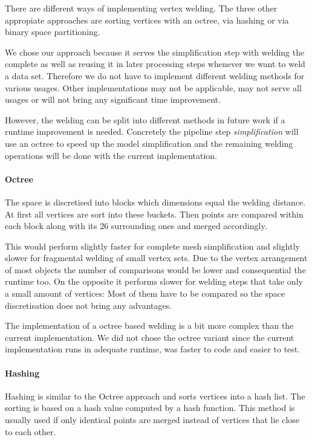 \documentclass[../ClassicThesis.tex]{subfiles}
\begin{document}
There are different ways of implementing vertex welding. The three other appropiate approaches are sorting vertices with an octree, via hashing or via binary space partitioning.

We chose our approach because it serves the simplification step with welding the complete {\threedmodel} as well as reusing it in later processing steps whenever we want to weld a data set. Therefore we do not have to implement different welding methods for various usages. Other implementations may not be applicable, may not serve all usages or will not bring any significant time improvement.

However, the welding can be split into different methods in future work if a runtime improvement is needed. Concretely the pipeline step \emph{simplification} will use an octree to speed up the model simplification and the remaining welding operations will be done with the current implementation.

\paragraph{Octree}

The space is discretised into blocks which dimensions equal the welding distance. At first all vertices are sort into these buckets. Then points are compared within each block along with its 26 surrounding ones and merged accordingly.

This would perform slightly faster for complete mesh simplification and slightly slower for fragmental welding of small vertex sets. Due to the vertex arrangement of most objects the number of comparisons would be lower and consequential the runtime too. On the opposite it performs slower for welding steps that take only a small amount of vertices: Most of them have to be compared so the space discretisation does not bring any advantages.

The implementation of a octree based welding is a bit more complex than the current implementation. We did not chose the octree variant since the current implementation runs in adequate runtime, was faster to code and easier to test.

\paragraph{Hashing}

Hashing is similar to the Octree approach and sorts vertices into a hash list. The sorting is based on a hash value computed by a hash function. This method is usually used if only identical points are merged instead of vertices that lie close to each other.
\end{document}
